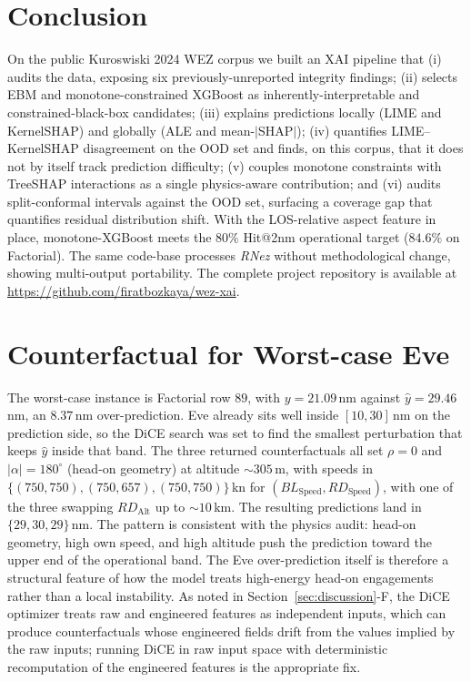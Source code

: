 \documentclass[conference]{IEEEtran}
\begin{document}
\section{Conclusion}
\label{sec:conclusion}
On the public Kuroswiski 2024 WEZ corpus we built an XAI pipeline that (i) audits the data, exposing six previously-unreported integrity findings; (ii) selects EBM and monotone-constrained XGBoost as inherently-interpretable and constrained-black-box candidates; (iii) explains predictions locally (LIME and KernelSHAP) and globally (ALE and mean-$|$SHAP$|$); (iv) quantifies LIME--KernelSHAP disagreement on the OOD set and finds, on this corpus, that it does not by itself track prediction difficulty; (v) couples monotone constraints with TreeSHAP interactions as a single physics-aware contribution; and (vi) audits split-conformal intervals against the OOD set, surfacing a coverage gap that quantifies residual distribution shift. With the LOS-relative aspect feature in place, monotone-XGBoost meets the $80\%$ Hit@2nm operational target ($84.6\%$ on Factorial). The same code-base processes \textit{RNez} without methodological change, showing multi-output portability. The complete project repository is available at \url{https://github.com/firatbozkaya/wez-xai}.

\appendices

\section{Counterfactual for Worst-case Eve}
\label{app:dice}
The worst-case instance is Factorial row $89$, with $y = 21.09$\,nm against $\hat{y} = 29.46$\,nm, an $8.37$\,nm over-prediction. Eve already sits well inside $[10, 30]$\,nm on the prediction side, so the DiCE search was set to find the smallest perturbation that keeps $\hat{y}$ inside that band. The three returned counterfactuals all set $\rho = 0$ and $|\alpha| = 180^{\circ}$ (head-on geometry) at altitude $\sim 305$\,m, with speeds in $\{(750, 750), (750, 657), (750, 750)\}$\,kn for $(BL_{\text{Speed}}, RD_{\text{Speed}})$, with one of the three swapping $RD_{\text{Alt}}$ up to $\sim 10$\,km. The resulting predictions land in $\{29, 30, 29\}$\,nm. The pattern is consistent with the physics audit: head-on geometry, high own speed, and high altitude push the prediction toward the upper end of the operational band. The Eve over-prediction itself is therefore a structural feature of how the model treats high-energy head-on engagements rather than a local instability. As noted in Section~\ref{sec:discussion}-F, the DiCE optimizer treats raw and engineered features as independent inputs, which can produce counterfactuals whose engineered fields drift from the values implied by the raw inputs; running DiCE in raw input space with deterministic recomputation of the engineered features is the appropriate fix.



\end{document}
